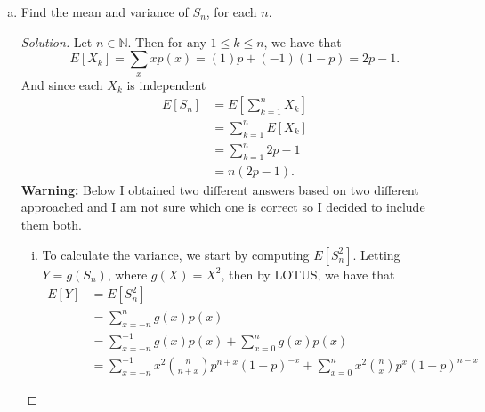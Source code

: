 \documentclass[12pt]{article}
\newenvironment{solution}
{\renewcommand\qedsymbol{$\blacksquare$}\begin{proof}[Solution]}
{\end{proof}}
\begin{document}
\begin{enumerate}
\begin{enumerate}[(a)]
\begin{solution}
\begin{equation*}
\begin{cases}
                                0, &\text{otherwise.}
                            \end{cases}
                        \end{equation*}
                    \end{solution}
                \item Find the mean and variance of $S_n$, for each $n$. 
                    \begin{solution}
                        Let $n\in\mathbb{N}$. Then for any $1\leq k\leq n$, we
                        have that 
                        \begin{equation*}
                            E[X_k]=\sum_{x}xp(x)=(1)p+(-1)(1-p)=2p-1.
                        \end{equation*}
                        And since each $X_k$ is
                        independent
                        \begin{align*}
                            E[S_n] &= E[\sum_{k=1}^{n}X_k] \\
                            &= \sum_{k=1}^{n}E[X_k] \\
                            &=\sum_{k=1}^{n}2p-1 \\
                            &=n(2p-1).
                        \end{align*}
                        \textbf{Warning:} Below I obtained two different
                        answers based on two different approached and I am not
                        sure which one is correct so I decided to include them
                        both. \hfill\par\hfill\par
                        \begin{enumerate}[(i)]
                            \item 
                        To calculate the variance, we start by computing
                        $E[S_n^2]$. Letting $Y=g(S_n)$, where $g(X)=X^2$, then
                        by LOTUS, we have that 
                        \begin{align*}
                            E[Y]&=E[S_n^2] \\
                            &=\sum_{x=-n}^{n}g(x)p(x) \\
                            &=\sum_{x=-n}^{-1}g(x)p(x)+\sum_{x=0}^{n}g(x)p(x) \\
                            &=\sum_{x=-n}^{-1}x^2\binom{n}{n+x}p^{n+x}
                            (1-p)^{-x}+\sum_{x=0}^{n}x^2\binom{n}{x}p^x(1-p)^{n-x}

\end{align*}
\end{enumerate}
\end{solution}
\end{enumerate}
\end{enumerate}
\end{document}
